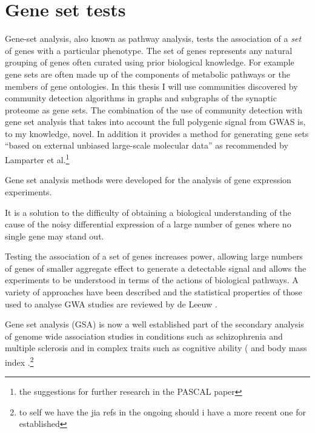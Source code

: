 \section{Gene set tests}
\label{sec:Gene set tests}
Gene-set analysis, also known as pathway analysis, tests the association of a \textit{set} of genes with a particular phenotype. The set of genes represents any natural grouping of genes often curated using prior biological knowledge. For example gene sets are often made up of the components of metabolic pathways or the members of gene ontologies. In this thesis I will use communities discovered by community detection algorithms in graphs and subgraphs of the synaptic proteome as gene sets. The combination of the use of community detection with gene set analysis that takes into account the full polygenic signal from GWAS is, to my knowledge, novel. In addition it provides a method for generating gene sets ``based on external unbiased large-scale molecular data'' as recommended by Lamparter et al.\footnote{the suggestions for further research in the PASCAL paper} \cite{lamparter2016fast}

Gene set analysis methods were developed for the analysis of gene expression experiments.\cite{tavazoie1999systematic}\cite{mootha2003pgc}

It is a solution to the difficulty of obtaining a biological understanding of the cause of the noisy differential expression of a large number of genes where no single gene may stand out.

Testing the association of a set of genes increases power\cite{wang2011gene}, allowing large numbers of genes of smaller aggregate effect to generate a detectable signal and allows the experiments to be understood in terms of the actions of biological pathways\cite{subramanian2005gene}. A variety of approaches have been described and the statistical properties of those used to analyse GWA studies are reviewed by de Leeuw \cite{de2016statistical}.

Gene set analysis (GSA) is now a well established part of the secondary analysis of genome wide association studies \cite{jia2011pathway} in conditions such as schizophrenia \cite{jia2010common} and multiple sclerosis \cite{baranzini2009pathway} and in complex traits such as cognitive ability (\cite{hill2014human} and body mass index  \cite{speliotes2010association}.\footnote{to self we have the jia refs in the ongoing should i have a more recent one for established} 

